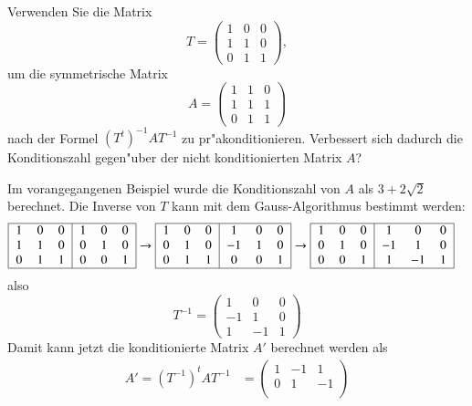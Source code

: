 Verwenden Sie die Matrix 
\[
T=\begin{pmatrix}
1&0&0\\
1&1&0\\
0&1&1
\end{pmatrix},
\]
um die symmetrische Matrix
\[
A=\begin{pmatrix}
1&1&0\\
1&1&1\\
0&1&1
\end{pmatrix}
\]
nach der Formel $(T^t)^{-1}AT^{-1}$ zu
pr"akonditionieren.
Verbessert sich dadurch die Konditionszahl gegen"uber der nicht konditionierten
Matrix $A$?

\begin{loesung}
Im vorangegangenen Beispiel wurde die Konditionszahl von $A$ als $3+2\sqrt{2}$
berechnet.
Die Inverse von $T$ kann mit dem Gauss-Algorithmus bestimmt werden:
\begin{align*}
\begin{tabular}{|>{$}c<{$}>{$}c<{$}>{$}c<{$}|>{$}c<{$}>{$}c<{$}>{$}c<{$}|}
\hline
1&0&0&1&0&0\\
1&1&0&0&1&0\\
0&1&1&0&0&1\\
\hline
\end{tabular}
&
\rightarrow
\begin{tabular}{|>{$}c<{$}>{$}c<{$}>{$}c<{$}|>{$}c<{$}>{$}c<{$}>{$}c<{$}|}
\hline
1&0&0& 1&0&0\\
0&1&0&-1&1&0\\
0&1&1& 0&0&1\\
\hline
\end{tabular}
\rightarrow
\begin{tabular}{|>{$}c<{$}>{$}c<{$}>{$}c<{$}|>{$}c<{$}>{$}c<{$}>{$}c<{$}|}
\hline
1&0&0& 1& 0&0\\
0&1&0&-1& 1&0\\
0&0&1& 1&-1&1\\
\hline
\end{tabular}
\end{align*}
also
\[
T^{-1}=
\begin{pmatrix}
 1& 0&0\\
-1& 1&0\\
 1&-1&1
\end{pmatrix}
\]
Damit kann jetzt die konditionierte Matrix $A'$ berechnet werden als
\begin{align*}
A'=
(T^{-1})^tAT^{-1}
&=
\begin{pmatrix}
 1&-1& 1\\
 0& 1&-1\\

\end{pmatrix}
\end{align*}
\end{loesung}
